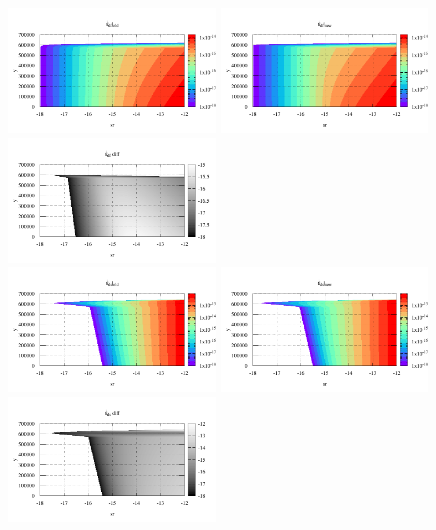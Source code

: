 \begin{itemize}
\newpage
\begin{center}
\includegraphics[width=5.5cm]{images/rheology/example/map_sr_df_old-1}
\includegraphics[width=5.5cm]{images/rheology/example/map_sr_df_new-1}
\includegraphics[width=5.5cm]{images/rheology/example/map_sr_df_diff-1}\\
\includegraphics[width=5.5cm]{images/rheology/example/map_sr_ds_old-1}
\includegraphics[width=5.5cm]{images/rheology/example/map_sr_ds_new-1}
\includegraphics[width=5.5cm]{images/rheology/example/map_sr_ds_diff-1}\\

\end{center}
\end{itemize}
